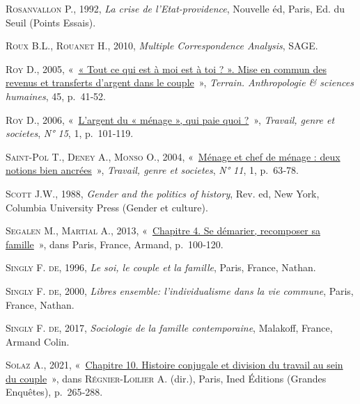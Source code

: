 \documentclass[
  12pt,
]{book}
\newlength{\cslhangindent}
\newenvironment{CSLReferences}[2] %
 {\begin{list}{}{%
  \setlength{\itemindent}{0pt}
  \setlength{\leftmargin}{0pt}
  \setlength{\parsep}{0pt}
  \ifodd #1
   \setlength{\leftmargin}{\cslhangindent}
   \setlength{\itemindent}{-1\cslhangindent}
  \fi
  \setlength{\itemsep}{#2\baselineskip}}}
 {\end{list}}
\begin{document}
\begin{CSLReferences}{0}{1}
\textsc{Rosanvallon P.}, 1992, \emph{La crise de l'Etat-providence},
Nouvelle éd, Paris, Ed. du Seuil (Points Essais).

\textsc{Roux B.L.}, \textsc{Rouanet H.}, 2010, \emph{Multiple
Correspondence Analysis}, SAGE.

\textsc{Roy D.}, 2005, {«~\href{https://doi.org/10.4000/terrain.3530}{«
Tout ce qui est à moi est à toi ? ». Mise en commun des revenus et
transferts d{'}argent dans le couple}~»}, \emph{Terrain. Anthropologie
\& sciences humaines}, 45, p.~41‑52.

\textsc{Roy D.}, 2006,
{«~\href{http://www.cairn.info/revue-travail-genre-et-societes-2006-1-page-101.htm}{L'argent
du « ménage », qui paie quoi ?}~»}, \emph{Travail, genre et societes},
\emph{N° 15}, 1, p.~101‑119.

\textsc{Saint-Pol T.}, \textsc{Deney A.}, \textsc{Monso O.}, 2004,
{«~\href{https://www.cairn.info/revue-travail-genre-et-societes-2004-1-page-63.htm}{Ménage
et chef de ménage : deux notions bien ancrées}~»}, \emph{Travail, genre
et societes}, \emph{N° 11}, 1, p.~63‑78.

\textsc{Scott J.W.}, 1988, \emph{Gender and the politics of history},
Rev. ed, New York, Columbia University Press (Gender et culture).

\textsc{Segalen M.}, \textsc{Martial A.}, 2013,
{«~\href{http://www.cairn.info/sociologie-de-la-famille--9782200624743-page-100.htm}{Chapitre
4. Se démarier, recomposer sa famille}~»}, dans Paris, France, Armand,
p.~100‑120.

\textsc{Singly F. de}, 1996, \emph{Le soi, le couple et la famille},
Paris, France, Nathan.

\textsc{Singly F. de}, 2000, \emph{Libres ensemble: l'individualisme
dans la vie commune}, Paris, France, Nathan.

\textsc{Singly F. de}, 2017, \emph{Sociologie de la famille
contemporaine}, Malakoff, France, Armand Colin.

\textsc{Solaz A.}, 2021,
{«~\href{http://books.openedition.org/ined/5068}{Chapitre 10. Histoire
conjugale et division du travail au sein du couple}~»}, dans
\textsc{Régnier-Loilier A.} (dir.), Paris, Ined Éditions (Grandes
Enquêtes), p.~265‑288.


\end{CSLReferences}
\end{document}
